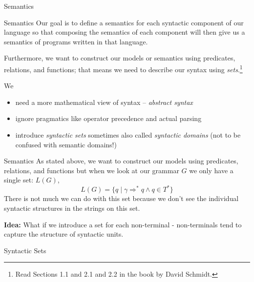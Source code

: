 \documentclass{beamer}
\begin{document}
\begin{frame}{Semantics}


\begin{frame}{Semantics}
Our goal is to define a semantics
for each syntactic component of our language so that composing the semantics of each component
will then give us a semantics of programs written in that language.

\vspace{.1in}
Furthermore,
we want to construct our models or semantics using predicates, relations, and functions; that means
we need to describe our syntax using {\em sets}.\footnote{\tiny Read Sections 1.1 and 2.1 and 2.2 in the book by David Schmidt.}

\vspace{.1in}

We
\begin{itemize}
\item need a more mathematical view of syntax -- {\em abstract syntax}
\item ignore pragmatics like operator precedence and actual  parsing
\item introduce  {\em syntactic sets} sometimes also called {\em syntactic domains}  (not to be confused with semantic domains!)
\end{itemize}

\end{frame}


\begin{frame}{Semantics}
As stated above, we want to construct our models using predicates, relations, and functions but when we look at our grammar $G$
we only have a single set: $L(G)$,
\[
L(G) = \{ q \mid \gamma \Rightarrow^* q \wedge q \in T^*\}
\]
There is not much we can do with this set because we don't see the individual syntactic structures in the strings on this set.

\vspace{.1in}

{\bf Idea:} What if we introduce a set for each non-terminal - non-terminals tend to capture the structure of syntactic units.
\end{frame}

\begin{frame}{Syntactic Sets}

\scriptsize


\end{frame}
\end{frame}
\end{document}
